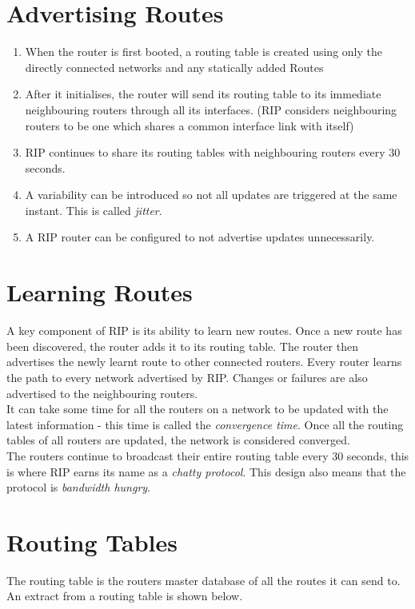 \section{Advertising Routes}
\begin{enumerate}
    \item When the router is first booted, a routing table is created using only the directly connected networks and any statically added Routes
    \item After it initialises, the router will send its routing table to its immediate neighbouring routers through all its interfaces. (RIP considers neighbouring routers to be one which shares a common interface link with itself)
    \item RIP continues to share its routing tables with neighbouring routers every 30 seconds.
    \item A variability can be introduced so not all updates are triggered at the same instant. This is called \textit{jitter}.
    \item A RIP router can be configured to not advertise updates unnecessarily.
\end{enumerate}

\section{Learning Routes}
A key component of RIP is its ability to learn new routes. Once a new route has been discovered, the router adds it to its routing table. The router then advertises the newly learnt route to other connected routers. Every router learns the path to every network advertised by RIP. Changes or failures are also advertised to the neighbouring routers.\\

It can take some time for all the routers on a network to be updated with the latest information - this time is called the \textit{convergence time}. Once all the routing tables of all routers are updated, the network is considered converged.\\

The routers continue to broadcast their entire routing table every 30 seconds, this is where RIP earns its name as a \textit{chatty protocol}. This design also means that the protocol is \textit{bandwidth hungry}. 

\section{Routing Tables}
The routing table is the routers master database of all the routes it can send to. An extract from a routing table is shown below.

